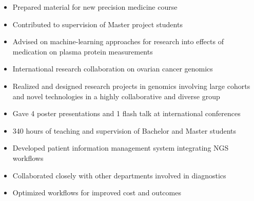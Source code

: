 \documentclass[10pt,a4paper,ragged2e,withhyper,normalphoto]{altacv}
\begin{document}
\begin{paracol}{2}
\begin{itemize}
  \item Prepared material for new precision medicine course
  \item Contributed to supervision of Master project students
  \item Advised on machine-learning approaches for research into effects of medication on plasma protein measurements
\end{itemize}
\divider

\begin{itemize}
  \item International research collaboration on ovarian cancer genomics
\end{itemize}

\divider

\begin{itemize}
  \item Realized and designed research projects in genomics involving large cohorts and novel technologies in a highly collaborative and diverse group
  \item Gave 4 poster presentations and 1 flash talk at international conferences
  \item 340 hours of teaching and supervision of Bachelor and Master students

\end{itemize}
\divider

\begin{itemize}
  \item Developed patient information management system integrating NGS workflows
  \item Collaborated closely with other departments involved in diagnostics
  \item Optimized workflows for improved cost and outcomes
\end{itemize}


\end{paracol}
\end{document}
